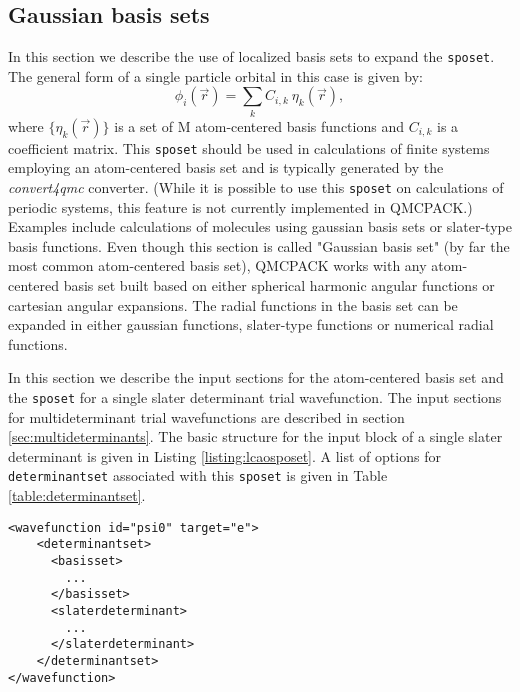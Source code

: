 \subsection{Gaussian basis sets}
\label{sec:gaussianbasis}

In this section we describe the use of localized basis sets to expand the \texttt{sposet}. The general form of a single particle orbital in this case is given by:
\begin{equation}
\phi_i(\vec{r}) = \sum_k C_{i,k} \ \eta_k(\vec{r}),
\end{equation}
where $\{\eta_k(\vec{r})\}$ is a set of M atom-centered basis functions and $C_{i,k}$ is a coefficient matrix. This \texttt{sposet} should be used in calculations of finite systems employing an atom-centered
basis set and is typically generated by the \textit{convert4qmc} converter. (While it is possible to use this \texttt{sposet} on calculations of periodic systems, this feature is not currently implemented in QMCPACK.) Examples include calculations of molecules using gaussian basis sets or slater-type basis functions. Even though this section is called "Gaussian basis set" (by far the most common atom-centered basis set), QMCPACK works with any atom-centered basis set built based on either spherical harmonic angular functions or cartesian angular expansions. The radial functions in the basis set can be expanded in either gaussian functions, slater-type functions or numerical radial functions. 

In this section we describe the input sections for the atom-centered basis set and the \texttt{sposet} for a single slater determinant trial wavefunction. The input sections for multideterminant trial wavefunctions are described in section \ref{sec:multideterminants}. The basic structure for the input block of a single slater determinant is given in Listing \ref{listing:lcaosposet}.
A list of options for \texttt{determinantset} associated with this \texttt{sposet} is given in Table \ref{table:determinantset}.

\begin{minipage}{\linewidth}
\begin{lstlisting}[caption=Basic input block for a single determinant trial wavefunction using a sposet expanded on an atom-centered basis set. \label{listing:lcaosposet}]
<wavefunction id="psi0" target="e">
    <determinantset>
      <basisset>
        ...
      </basisset>
      <slaterdeterminant>
        ...
      </slaterdeterminant>
    </determinantset>    
</wavefunction>
\end{lstlisting}
\end{minipage}

